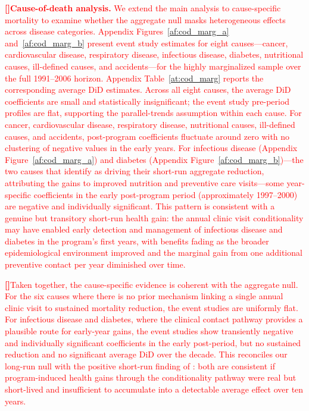 \documentclass[12pt]{article}
\newcounter{paragraphnum}
\newcommand{\p}{\refstepcounter{paragraphnum}\textbf{[\theparagraphnum]}\enspace}
\begin{document}
\textcolor{red}{\p \textbf{Cause-of-death analysis.} We extend the main analysis to cause-specific mortality to examine whether the aggregate null masks heterogeneous effects across disease categories. Appendix Figures~\ref{af:cod_marg_a} and~\ref{af:cod_marg_b} present event study estimates for eight causes—cancer, cardiovascular disease, respiratory disease, infectious disease, diabetes, nutritional causes, ill-defined causes, and accidents—for the highly marginalized sample over the full 1991--2006 horizon. Appendix Table~\ref{at:cod_marg} reports the corresponding average DiD estimates. Across all eight causes, the average DiD coefficients are small and statistically insignificant; the event study pre-period profiles are flat, supporting the parallel-trends assumption within each cause. For cancer, cardiovascular disease, respiratory disease, nutritional causes, ill-defined causes, and accidents, post-program coefficients fluctuate around zero with no clustering of negative values in the early years. For infectious disease (Appendix Figure~\ref{af:cod_marg_a}) and diabetes (Appendix Figure~\ref{af:cod_marg_b})—the two causes that \cite{BarhamRowberry2013JDE} identify as driving their short-run aggregate reduction, attributing the gains to improved nutrition and preventive care visits—some year-specific coefficients in the early post-program period (approximately 1997--2000) are negative and individually significant. This pattern is consistent with a genuine but transitory short-run health gain: the annual clinic visit conditionality may have enabled early detection and management of infectious disease and diabetes in the program's first years, with benefits fading as the broader epidemiological environment improved and the marginal gain from one additional preventive contact per year diminished over time.}

\textcolor{red}{\p Taken together, the cause-specific evidence is coherent with the aggregate null. For the six causes where there is no prior mechanism linking a single annual clinic visit to sustained mortality reduction, the event studies are uniformly flat. For infectious disease and diabetes, where the clinical contact pathway provides a plausible route for early-year gains, the event studies show transiently negative and individually significant coefficients in the early post-period, but no sustained reduction and no significant average DiD over the decade. This reconciles our long-run null with the positive short-run finding of \cite{BarhamRowberry2013JDE}: both are consistent if program-induced health gains through the conditionality pathway were real but short-lived and insufficient to accumulate into a detectable average effect over ten years.}
\end{document}
